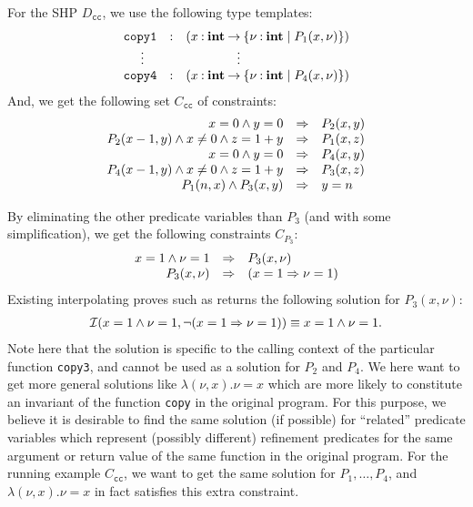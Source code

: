 For the SHP \(D_{\texttt{cc}}\), we use the following type templates:
\[
\begin{array}{rcl}
\texttt{copy1}&\mathbin{:}&(x\mathbin{:}{\mathbf{int}}\mathbin{\rightarrow}{\{{\nu\mathbin{:}\mathbf{int} \mid P_1(x,\nu)}\}}) \\
\vdots\quad &&\qquad\qquad \vdots \\
\texttt{copy4}&\mathbin{:}&(x\mathbin{:}{\mathbf{int}}\mathbin{\rightarrow}{\{{\nu\mathbin{:}\mathbf{int} \mid P_4(x,\nu)}\}})
\end{array}
\]
And, we get the following set \(C_{\texttt{cc}}\) of constraints:
\[
\begin{array}{rcl}
x=0 \land y=0 &\Rightarrow& P_2(x,y) \\
P_2(x-1,y) \land x\neq0 \land z=1+y &\Rightarrow& P_1(x,z) \\
x=0 \land y=0 &\Rightarrow& P_4(x,y) \\
P_4(x-1,y) \land x\neq0 \land z=1+y &\Rightarrow& P_3(x,z) \\
P_1(n,x) \land P_3(x,y) &\Rightarrow& y=n
\end{array}
\]

By eliminating the other predicate variables than \(P_3\) (and with some
simplification), we get the following constraints \(C_{P_3}\):
\[
\begin{array}{rcl}
x=1 \land \nu=1 &\Rightarrow& P_3(x,\nu) \\
P_3(x,\nu) &\Rightarrow& (x=1 \Rightarrow \nu=1)
\end{array}
\]
Existing interpolating proves such as \cite{Beyer2008} returns the
following solution for \(P_3(x,\nu)\):
\begin{eqnarray*}
\mathcal{I}(x=1 \land \nu=1,\neg (x=1 \Rightarrow \nu=1))
\equiv x=1 \land \nu=1.
\end{eqnarray*}
Note here that the solution is specific to the calling context of the
particular function \texttt{copy3}, and cannot be used as a solution for
\(P_2\) and \(P_4\).  We here want to get more general solutions like
\(\lambda (\nu,x).\nu=x\) which are more likely to constitute an
invariant of the function \texttt{copy} in the original program.  For
this purpose, we believe it is desirable to find the same solution (if
possible) for ``related'' predicate variables which represent (possibly
different) refinement predicates for the same argument or return value
of the same function in the original program.  For the running example
\(C_{\texttt{cc}}\), we want to get the same solution for
\(P_1,\dots,P_4\), and \(\lambda (\nu,x).\nu=x\) in fact satisfies this
extra constraint.

